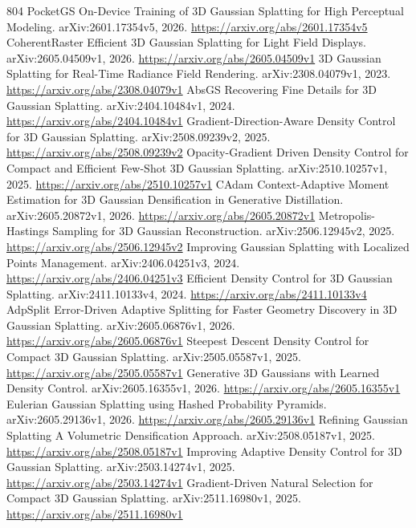 \documentclass[11pt]{article}
\begin{document}
\begin{thebibliography}{804}
 PocketGS On-Device Training of 3D Gaussian Splatting for High Perceptual Modeling. arXiv:2601.17354v5, 2026. \url{https://arxiv.org/abs/2601.17354v5}
 CoherentRaster Efficient 3D Gaussian Splatting for Light Field Displays. arXiv:2605.04509v1, 2026. \url{https://arxiv.org/abs/2605.04509v1}
 3D Gaussian Splatting for Real-Time Radiance Field Rendering. arXiv:2308.04079v1, 2023. \url{https://arxiv.org/abs/2308.04079v1}
 AbsGS Recovering Fine Details for 3D Gaussian Splatting. arXiv:2404.10484v1, 2024. \url{https://arxiv.org/abs/2404.10484v1}
 Gradient-Direction-Aware Density Control for 3D Gaussian Splatting. arXiv:2508.09239v2, 2025. \url{https://arxiv.org/abs/2508.09239v2}
 Opacity-Gradient Driven Density Control for Compact and Efficient Few-Shot 3D Gaussian Splatting. arXiv:2510.10257v1, 2025. \url{https://arxiv.org/abs/2510.10257v1}
 CAdam Context-Adaptive Moment Estimation for 3D Gaussian Densification in Generative Distillation. arXiv:2605.20872v1, 2026. \url{https://arxiv.org/abs/2605.20872v1}
 Metropolis-Hastings Sampling for 3D Gaussian Reconstruction. arXiv:2506.12945v2, 2025. \url{https://arxiv.org/abs/2506.12945v2}
 Improving Gaussian Splatting with Localized Points Management. arXiv:2406.04251v3, 2024. \url{https://arxiv.org/abs/2406.04251v3}
 Efficient Density Control for 3D Gaussian Splatting. arXiv:2411.10133v4, 2024. \url{https://arxiv.org/abs/2411.10133v4}
 AdpSplit Error-Driven Adaptive Splitting for Faster Geometry Discovery in 3D Gaussian Splatting. arXiv:2605.06876v1, 2026. \url{https://arxiv.org/abs/2605.06876v1}
 Steepest Descent Density Control for Compact 3D Gaussian Splatting. arXiv:2505.05587v1, 2025. \url{https://arxiv.org/abs/2505.05587v1}
 Generative 3D Gaussians with Learned Density Control. arXiv:2605.16355v1, 2026. \url{https://arxiv.org/abs/2605.16355v1}
 Eulerian Gaussian Splatting using Hashed Probability Pyramids. arXiv:2605.29136v1, 2026. \url{https://arxiv.org/abs/2605.29136v1}
 Refining Gaussian Splatting A Volumetric Densification Approach. arXiv:2508.05187v1, 2025. \url{https://arxiv.org/abs/2508.05187v1}
 Improving Adaptive Density Control for 3D Gaussian Splatting. arXiv:2503.14274v1, 2025. \url{https://arxiv.org/abs/2503.14274v1}
 Gradient-Driven Natural Selection for Compact 3D Gaussian Splatting. arXiv:2511.16980v1, 2025. \url{https://arxiv.org/abs/2511.16980v1}

\end{thebibliography}
\end{document}
